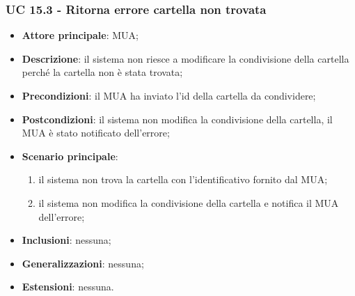\subsubsection{UC 15.3 - Ritorna errore cartella non trovata} \label{sec:UC15.3}
    \begin{itemize}
        \item \textbf{Attore principale}: MUA;
        \item \textbf{Descrizione}: il sistema non riesce a modificare la condivisione della cartella perché la cartella non è stata trovata;
        \item \textbf{Precondizioni}: il MUA ha inviato l'id della cartella da condividere;
        \item \textbf{Postcondizioni}: il sistema non modifica la condivisione della cartella, il MUA è stato notificato dell'errore;
        \item \textbf{Scenario principale}:
            \begin{enumerate}
                \item il sistema non trova la cartella con l'identificativo fornito dal MUA;
                \item il sistema non modifica la condivisione della cartella e notifica il MUA dell'errore;
            \end{enumerate}
        \item \textbf{Inclusioni}: nessuna;
        \item \textbf{Generalizzazioni}: nessuna;
        \item \textbf{Estensioni}: nessuna.
    \end{itemize}

